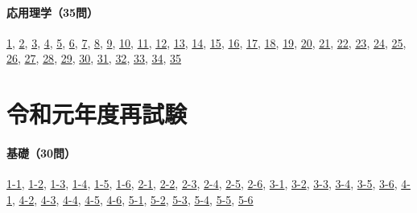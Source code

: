 \paragraph{応用理学（35問）} \hyperref[q:r01-reg-applied-01]{1}, \hyperref[q:r01-reg-applied-02]{2}, \hyperref[q:r01-reg-applied-03]{3}, \hyperref[q:r01-reg-applied-04]{4}, \hyperref[q:r01-reg-applied-05]{5}, \hyperref[q:r01-reg-applied-06]{6}, \hyperref[q:r01-reg-applied-07]{7}, \hyperref[q:r01-reg-applied-08]{8}, \hyperref[q:r01-reg-applied-09]{9}, \hyperref[q:r01-reg-applied-10]{10}, \hyperref[q:r01-reg-applied-11]{11}, \hyperref[q:r01-reg-applied-12]{12}, \hyperref[q:r01-reg-applied-13]{13}, \hyperref[q:r01-reg-applied-14]{14}, \hyperref[q:r01-reg-applied-15]{15}, \hyperref[q:r01-reg-applied-16]{16}, \hyperref[q:r01-reg-applied-17]{17}, \hyperref[q:r01-reg-applied-18]{18}, \hyperref[q:r01-reg-applied-19]{19}, \hyperref[q:r01-reg-applied-20]{20}, \hyperref[q:r01-reg-applied-21]{21}, \hyperref[q:r01-reg-applied-22]{22}, \hyperref[q:r01-reg-applied-23]{23}, \hyperref[q:r01-reg-applied-24]{24}, \hyperref[q:r01-reg-applied-25]{25}, \hyperref[q:r01-reg-applied-26]{26}, \hyperref[q:r01-reg-applied-27]{27}, \hyperref[q:r01-reg-applied-28]{28}, \hyperref[q:r01-reg-applied-29]{29}, \hyperref[q:r01-reg-applied-30]{30}, \hyperref[q:r01-reg-applied-31]{31}, \hyperref[q:r01-reg-applied-32]{32}, \hyperref[q:r01-reg-applied-33]{33}, \hyperref[q:r01-reg-applied-34]{34}, \hyperref[q:r01-reg-applied-35]{35}
\section{令和元年度再試験}
\paragraph{基礎（30問）} \hyperref[q:r01-ret-basic-1-1]{1-1}, \hyperref[q:r01-ret-basic-1-2]{1-2}, \hyperref[q:r01-ret-basic-1-3]{1-3}, \hyperref[q:r01-ret-basic-1-4]{1-4}, \hyperref[q:r01-ret-basic-1-5]{1-5}, \hyperref[q:r01-ret-basic-1-6]{1-6}, \hyperref[q:r01-ret-basic-2-1]{2-1}, \hyperref[q:r01-ret-basic-2-2]{2-2}, \hyperref[q:r01-ret-basic-2-3]{2-3}, \hyperref[q:r01-ret-basic-2-4]{2-4}, \hyperref[q:r01-ret-basic-2-5]{2-5}, \hyperref[q:r01-ret-basic-2-6]{2-6}, \hyperref[q:r01-ret-basic-3-1]{3-1}, \hyperref[q:r01-ret-basic-3-2]{3-2}, \hyperref[q:r01-ret-basic-3-3]{3-3}, \hyperref[q:r01-ret-basic-3-4]{3-4}, \hyperref[q:r01-ret-basic-3-5]{3-5}, \hyperref[q:r01-ret-basic-3-6]{3-6}, \hyperref[q:r01-ret-basic-4-1]{4-1}, \hyperref[q:r01-ret-basic-4-2]{4-2}, \hyperref[q:r01-ret-basic-4-3]{4-3}, \hyperref[q:r01-ret-basic-4-4]{4-4}, \hyperref[q:r01-ret-basic-4-5]{4-5}, \hyperref[q:r01-ret-basic-4-6]{4-6}, \hyperref[q:r01-ret-basic-5-1]{5-1}, \hyperref[q:r01-ret-basic-5-2]{5-2}, \hyperref[q:r01-ret-basic-5-3]{5-3}, \hyperref[q:r01-ret-basic-5-4]{5-4}, \hyperref[q:r01-ret-basic-5-5]{5-5}, \hyperref[q:r01-ret-basic-5-6]{5-6}
